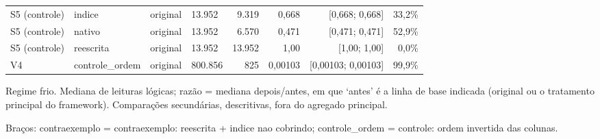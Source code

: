 {\begin{tabular}{llllrrrr}
S5 (controle) & indice & original & 13.952 & 9.319 & 0,668 & [0,668; 0,668] & 33,2\% \\
S5 (controle) & nativo & original & 13.952 & 6.570 & 0,471 & [0,471; 0,471] & 52,9\% \\
S5 (controle) & reescrita & original & 13.952 & 13.952 & 1,00 & [1,00; 1,00] & 0,0\% \\
V4 & controle\_ordem & original & 800.856 & 825 & 0,00103 & [0,00103; 0,00103] & 99,9\% \\
\bottomrule
\end{tabular}\par
\vspace{3pt}
\begin{minipage}{\linewidth}\footnotesize
Regime frio. Mediana de leituras lógicas; razão = mediana depois/antes, em que `antes' é a linha de base indicada (original ou o tratamento principal do framework). Comparações secundárias, descritivas, fora do agregado principal.\par
Braços: contraexemplo = contraexemplo: reescrita + indice nao cobrindo; controle\_ordem = controle: ordem invertida das colunas.
\end{minipage}
}
